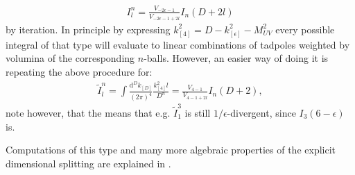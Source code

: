 \begin{align}
	I_l^{n}=\frac{V_{-2\epsilon-1}}{V_{-2\epsilon-1+2l}} I_n(D+2l)
\end{align}
by iteration. In principle by expressing $k_{[4]}^2=D-k_{[\epsilon]}^2-M_{UV}^2$ every possible integral of that type will evaluate to linear combinations of tadpoles weighted by volumina of the corresponding $n$-balls. However, an easier way of doing it is repeating the above procedure for:
\begin{align}
\tilde{I}_l^{n}=\int \frac{\text{d}^D k_{[D]}}{(2 \pi)^4} \frac{k_{[4]}^2l}{D^n} = \frac{V_{4-1}}{V_{4-1+2l}} I_n(D+2),
\end{align}
note however, that the means that e.g. $\tilde{I}_{1}^{3}$ is still $1/\epsilon$-divergent, since $I_{3}(6-\epsilon)$ is.

 Computations of this type and many more algebraic properties of the explicit dimensional splitting are explained in \cite{Gnendiger:2017pys}.